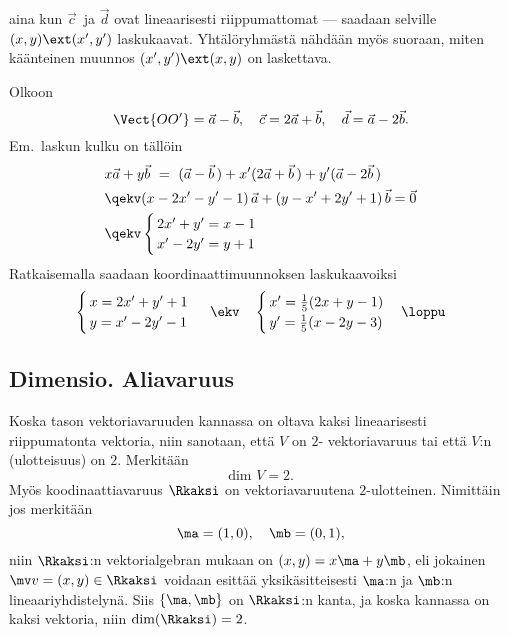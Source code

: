 aina kun $\vec c\,$ ja $\vec d$ ovat lineaarisesti riippumattomat --- saadaan selville 
%
 $(x,y) \ext (x',y')$ laskukaavat. Yhtälöryhmästä nähdään myös 
suoraan, miten käänteinen muunnos $(x',y') \ext (x,y)$ on laskettava. 
\begin{Exa} Olkoon
\[
\Vect{OO'}=\vec a - \vec b, \quad \vec c=2\vec a+\vec b, \quad \vec d=\vec a-2\vec b.
\]
Em.\ laskun kulku on tällöin
\begin{align*}
&x\vec a+y\vec b\ =\ (\vec a-\vec b\,)+x'(2\vec a+\vec b\,)+y'(\vec a-2\vec b\,) \\
&\qekv (x-2x'-y'-1)\,\vec a + (y-x'+2y'+1)\,\vec b = \vec 0 \\
&\qekv \begin{cases} \,2x'+y'=x-1 \\ \,x'-2y'=y+1 \end{cases}
\end{align*}
Ratkaisemalla saadaan koordinaattimuunnoksen laskukaavoiksi
\[
\begin{cases} \,x=2x'+y'+1\\ \,y=x'-2y'-1 \end{cases}\ \ekv \quad
\begin{cases} \,x'=\frac{1}{5}(2x+y-1) \\ \,y'=\frac{1}{5}(x-2y-3) \end{cases} \loppu
\]
\end{Exa}

\subsection{Dimensio. Aliavaruus}
 

Koska tason vektoriavaruuden kannassa on oltava kaksi lineaarisesti riippumatonta vektoria, niin
sanotaan, että $V$ on $2$- vektoriavaruus tai että $V$:n 
(ulotteisuus) on $2$. Merkitään
\[
\text{dim } V=2.
\]
Myös koodinaattiavaruus $\Rkaksi$ on vektoriavaruutena $2$-ulotteinen. Nimittäin jos merkitään
\[
\ma=(1,0), \quad \mb=(0,1),
\]
niin $\Rkaksi$:n vektorialgebran mukaan on $(x,y)=x\ma + y\mb$, eli jokainen
$\mv v = (x,y) \in \Rkaksi$ voidaan esittää yksikäsitteisesti $\ma$:n ja $\mb$:n
lineaariyhdistelynä. Siis $\{\ma,\mb\}$ on $\Rkaksi$:n kanta, ja koska kannassa on kaksi
vektoria, niin $\text{dim}(\Rkaksi)=2$.

